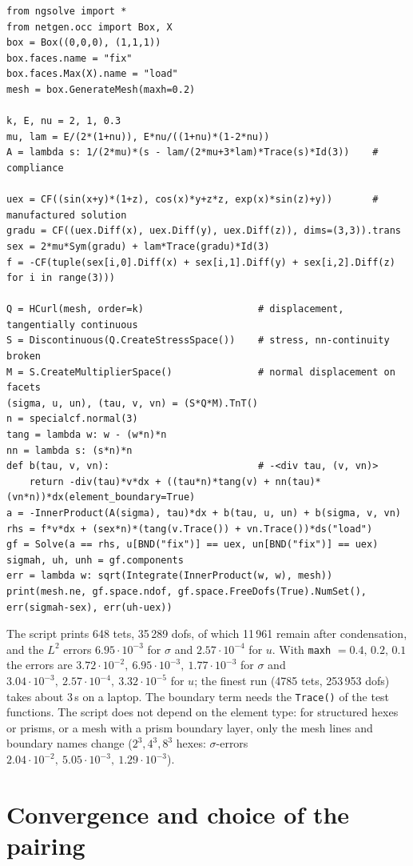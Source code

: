 \documentclass[10pt,a4paper]{article}
\newcommand{\code}[1]{\texttt{#1}}
\begin{document}
\begin{lstlisting}
from ngsolve import *
from netgen.occ import Box, X
box = Box((0,0,0), (1,1,1))
box.faces.name = "fix"
box.faces.Max(X).name = "load"
mesh = box.GenerateMesh(maxh=0.2)

k, E, nu = 2, 1, 0.3
mu, lam = E/(2*(1+nu)), E*nu/((1+nu)*(1-2*nu))
A = lambda s: 1/(2*mu)*(s - lam/(2*mu+3*lam)*Trace(s)*Id(3))    # compliance

uex = CF((sin(x+y)*(1+z), cos(x)*y+z*z, exp(x)*sin(z)+y))       # manufactured solution
gradu = CF((uex.Diff(x), uex.Diff(y), uex.Diff(z)), dims=(3,3)).trans
sex = 2*mu*Sym(gradu) + lam*Trace(gradu)*Id(3)
f = -CF(tuple(sex[i,0].Diff(x) + sex[i,1].Diff(y) + sex[i,2].Diff(z) for i in range(3)))

Q = HCurl(mesh, order=k)                    # displacement, tangentially continuous
S = Discontinuous(Q.CreateStressSpace())    # stress, nn-continuity broken
M = S.CreateMultiplierSpace()               # normal displacement on facets
(sigma, u, un), (tau, v, vn) = (S*Q*M).TnT()
n = specialcf.normal(3)
tang = lambda w: w - (w*n)*n
nn = lambda s: (s*n)*n
def b(tau, v, vn):                          # -<div tau, (v, vn)>
    return -div(tau)*v*dx + ((tau*n)*tang(v) + nn(tau)*(vn*n))*dx(element_boundary=True)
a = -InnerProduct(A(sigma), tau)*dx + b(tau, u, un) + b(sigma, v, vn)
rhs = f*v*dx + (sex*n)*(tang(v.Trace()) + vn.Trace())*ds("load")
gf = Solve(a == rhs, u[BND("fix")] == uex, un[BND("fix")] == uex)
sigmah, uh, unh = gf.components
err = lambda w: sqrt(Integrate(InnerProduct(w, w), mesh))
print(mesh.ne, gf.space.ndof, gf.space.FreeDofs(True).NumSet(), err(sigmah-sex), err(uh-uex))
\end{lstlisting}

The script prints 648 tets, 35\,289 dofs, of which 11\,961 remain after condensation, and the $L^2$ errors $6.95\cdot10^{-3}$ for $\sigma$ and $2.57\cdot10^{-4}$ for $u$. With \code{maxh} $=0.4,\,0.2,\,0.1$ the errors are $3.72\cdot10^{-2},\ 6.95\cdot10^{-3},\ 1.77\cdot10^{-3}$ for $\sigma$ and $3.04\cdot10^{-3},\ 2.57\cdot10^{-4},\ 3.32\cdot10^{-5}$ for $u$; the finest run (4785 tets, 253\,953 dofs) takes about 3\,s on a laptop.
The boundary term needs the \code{Trace()} of the test functions. The script does not depend on the element type: for structured hexes or prisms, or a mesh with a prism boundary layer, only the mesh lines and boundary names change ($2^3,4^3,8^3$ hexes: $\sigma$-errors $2.04\cdot10^{-2},\ 5.05\cdot10^{-3},\ 1.29\cdot10^{-3}$).

\section{Convergence and choice of the pairing}
\end{document}
